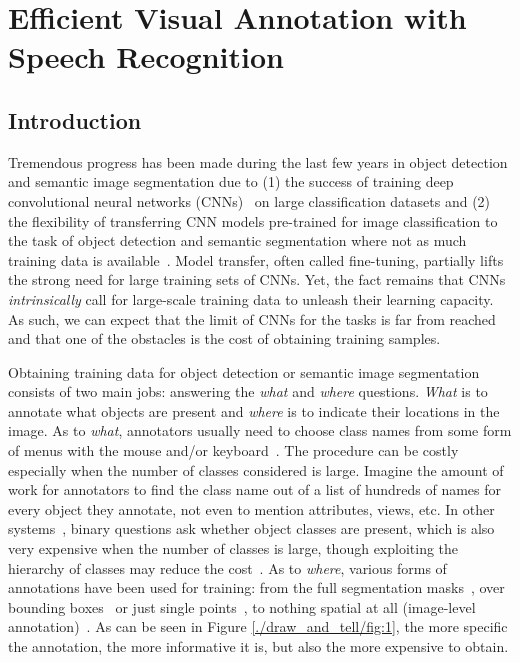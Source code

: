 \chapter{Efficient Visual Annotation with Speech Recognition}
\label{ch:draw-and-tell}

\section{Introduction}
Tremendous progress has been made during the last few years in 
object detection and semantic image segmentation due to (1) the success of
training deep convolutional neural networks (CNNs)~\citep{deepnet:nips12, Decaf:icml2014, vgg16} on large classification datasets and (2) the
flexibility of transferring CNN models pre-trained for image classification to the
task of object detection and semantic segmentation where not as much training data is
available~\citep{rcnn, Long_2015_CVPR, rcnn_crf}. Model transfer,
often called fine-tuning, partially lifts the strong need for large
training sets of CNNs. Yet, the fact remains that CNNs \emph{intrinsically} 
call for large-scale training data to unleash their learning capacity. 
As such, we can expect that the limit of CNNs for the tasks
is far from reached and that one of the obstacles 
is the cost of obtaining training samples.  

Obtaining training data for object detection or semantic image segmentation consists of two main
jobs: answering the \emph{what} and \emph{where} questions. \emph{What} is to annotate what
objects are present and \emph{where} is to indicate their locations in
the image.  As to \emph{what}, annotators usually need to choose class
names from some form of menus with the mouse and/or
keyboard~\citep{open:surface}. The procedure can be costly especially
when the number of classes considered is large. Imagine the amount of
work for annotators to find the class name out of a list of hundreds
of names for every object they annotate, not even to mention
attributes, views, etc. In other systems~\citep{whatpoint, coco:eccv},
binary questions ask whether object classes are present, which is also
very expensive when the number of classes is large, though exploiting
the hierarchy of classes may reduce the
cost~\citep{scalable:annotation, coco:eccv}. As to \emph{where},
various forms of annotations have been used for training: from the
full segmentation masks~\citep{rcnn, rcnn_crf, crfasrnn}, over
bounding boxes~\citep{weak:seg:xu, BoxSup, ConsCNN} or just single
points~\citep{whatpoint}, to nothing spatial at all (image-level
annotation)~\citep{markov:topic, cnn:em}.  As can be seen in Figure \ref{./draw_and_tell/fig:1}, the more
specific the annotation, the more informative it is, but also the more
expensive to obtain. %

